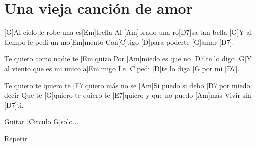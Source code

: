 \section{Una vieja canción de amor}

\noindent
\chordG
\chordEm
\chordAm
\chordDs
\chordC 
\chordD 

\vspace{1cm}

\begin{guitar}

	[G]Al cielo le robe una es[Em]trella
	Al [Am]prado una ro[D7]sa tan bella
	[G]Y al tiempo le pedi un mo[Em]mento
	Con[C]tigo [D]para poderte [G]amar [D7].

	\newline
	[G]Te quiero como nadie te [Em]quizo
	Por [Am]miedo es que no [D7]te lo digo
	[G]Y al viento que es mi unico a[Em]migo
	Le [C]pedi [D]te lo diga [G]por mi [D7].

	\newline
	[G]Te quiero te quiero te [E7]quiero más no se
	[Am]Si puedo si debo [D7]por miedo decir
	Que te [G]quiero te quiero te [E7]quiero 
	y que no puedo [Am]más
	Vivir sin [D7]ti.
	
	\newline
	[G]Guitar [Circulo G]solo...

	\newline
	Repetir
\end{guitar}
